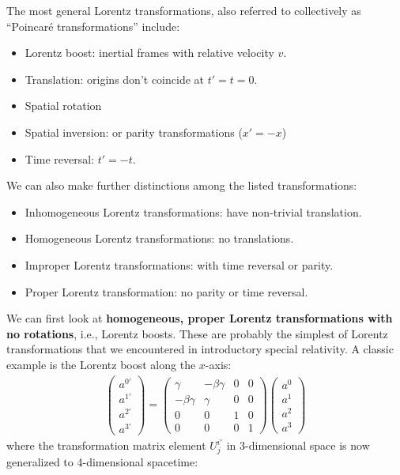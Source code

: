 \documentclass{article}
\theoremstyle{definition}
\begin{document}
The most general Lorentz transformations, also referred to collectively as ``Poincar\'e transformations'' include:
\begin{itemize}
	\item Lorentz boost: inertial frames with relative velocity $v$.
	\item Translation: origins don't coincide at $t'=t=0$.
	\item Spatial rotation
	\item Spatial inversion: or parity transformations ($x' = -x$)
	\item Time reversal: $t'=-t$.
\end{itemize} 
We can also make further distinctions among the listed transformations:
\begin{itemize}
	\item Inhomogeneous Lorentz transformations: have non-trivial translation.
	\item Homogeneous Lorentz transformations: no translations.
	\item Improper Lorentz transformations: with time reversal or parity.
	\item Proper Lorentz transformation: no parity or time reversal.
\end{itemize}
We can first look at \textbf{homogeneous, proper Lorentz transformations with no rotations}, i.e., Lorentz boosts. These are probably the simplest of Lorentz transformations that we encountered in introductory special relativity. A classic example is the Lorentz boost along the $x$-axis:
\begin{align*}
\begin{pmatrix}
a^{0'}\\a^{1'}\\a^{2'}\\a^{3'}
\end{pmatrix}
=
\begin{pmatrix}
\gamma & -\beta\gamma & 0 & 0\\
-\beta\gamma & \gamma & 0 & 0\\
0 & 0 & 1 & 0\\
0 & 0 & 0 & 1
\end{pmatrix}
\begin{pmatrix}
a^{0}\\a^{1}\\a^{2}\\a^{3}
\end{pmatrix}
\end{align*}
where the transformation matrix element $U^{i'}_j$ in 3-dimensional space is now generalized to 4-dimensional spacetime:
\end{document}
